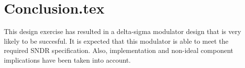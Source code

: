 \section{Conclusion.tex}
\label{Conclusion}
This design exercise has resulted in a delta-sigma modulator design that is very likely to be succesful.
It is expected that this modulator is able to meet the required SNDR specification.
Also, implementation and non-ideal component implications have been taken into account.

